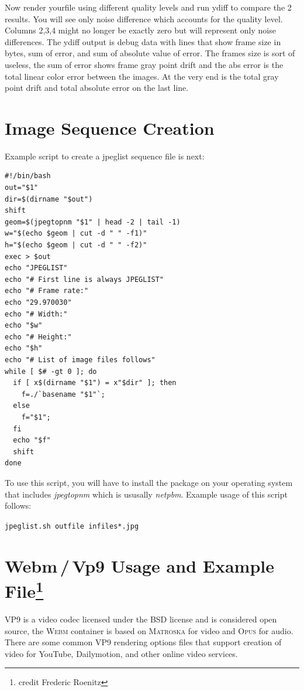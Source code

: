 Now render yourfile using different quality levels and run ydiff to compare the 2 results. You will see only noise difference which accounts for the quality level. Columns 2,3,4 might no longer be exactly zero but will represent only noise differences. The ydiff output is debug data with lines that show frame size in bytes, sum of error, and sum of absolute value of error. The frames size is sort of useless, the sum of error shows frame gray point drift and the abs error is the total linear color error between the images. At the very end is the total gray point drift and total absolute error on the last line.


\section{Image Sequence Creation}
\label{sec:image_sequence_creation}

Example script to create a jpeglist sequence file is next:
\begin{lstlisting}[numbers=none]
#!/bin/bash
out="$1"
dir=$(dirname "$out")
shift
geom=$(jpegtopnm "$1" | head -2 | tail -1)
w="$(echo $geom | cut -d " " -f1)"
h="$(echo $geom | cut -d " " -f2)"
exec > $out
echo "JPEGLIST"
echo "# First line is always JPEGLIST"
echo "# Frame rate:"
echo "29.970030"
echo "# Width:"
echo "$w"
echo "# Height:"
echo "$h"
echo "# List of image files follows"
while [ $# -gt 0 ]; do
  if [ x$(dirname "$1") = x"$dir" ]; then
	f=./`basename "$1"`;
  else
	f="$1";
  fi
  echo "$f"
  shift
done
\end{lstlisting}
To use this script, you will have to install the package on your operating system that
includes \textit{jpegtopnm} which is ususally \textit{netpbm}.
Example usage of this script follows:

\qquad \texttt{jpeglist.sh outfile infiles*.jpg}

\section{Webm\,/\,Vp9 Usage and Example File\protect\footnote{credit Frederic Roenitz}}%
\label{sec:webm/vp9_usage_example}

\textsc{VP9} is a video codec licensed under the BSD license and is
considered open source,
the \textsc{Webm} container is based on \textsc{Matroska} for video
and \textsc{Opus} for audio. There are some common \textsc{VP9} rendering
options files that support creation of video for YouTube,
Dailymotion, and other online video services.

